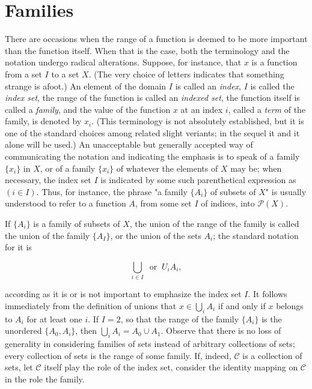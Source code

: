 
\chapter{Families}

There are occasions when the range of a function is deemed to be more important than the function itself. When that is the case, both the terminology and the notation undergo radical alterations. Suppose, for instance, that $x$ is a function from a set $I$ to a set $X$. (The very choice of letters indicates that something strange is afoot.) An element of the domain $I$ is called an \textit{index}, $I$ is called the \textit{index set}, the range of the function is called an \textit{indexed set}, the function itself is called a \textit{family}, and the value of the function $x$ at an index $i$, called a \textit{term} of the family, is denoted by $x_{i}$. (This terminology is not absolutely established, but it is one of the standard choices among related slight veriants; in the sequel it and it alone will be used.) An unacceptable but generally accepted way of communicating the notation and indicating the emphasis is to speak of a family $\{ x_{i}  \}$ in $X$, or of a family $\{ x_{i} \}$ of whatever the elements of $X$ may be; when necessary, the index set $I$ is indicated by some such parenthetical expression as $(i \in I)$. Thus, for instance, the phrase "a family $\{ A_{i} \}$ of subsets of $X$" is usually understood to refer to a function $A$, from some set $I$ of indices, into $\mathcal{P}(X)$. 

If $ \{ A_{i} \}$ is a family of subsets of $X$, the union of the range of the family is called the union of the family $\{ A_{I} \}$, or the union of the sets $A_{i}$; the standard notation for it is

\begin{equation*}
\bigcup_{i \in I} \: \text{ or } \: U_{i}A_{i},
\end{equation*}

according as it is or is not important to emphasize the index set $I$. It follows immediately from the definition of unions that $x \in \bigcup_{i} A_{i}$ if and only if $x$ belongs to $A_{i}$ for at least one $i$. If $I = 2$, so that the range of the family $\{ A_{i} \}$ is the unordered $\{ A_{0}, A_{i} \} $, then $\bigcup_{i}A_{i} =  A_{0} \cup A_{1}$. Observe that there is no loss of generality in considering families of sets instead of arbitrary collections of sets; every collection of sets is the range of some family. If, indeed, $\mathcal{C}$ is a collection of sets, let $\mathcal{C}$ itself play the role of the index set, consider the identity mapping on $\mathcal{C}$ in the role the family. 

